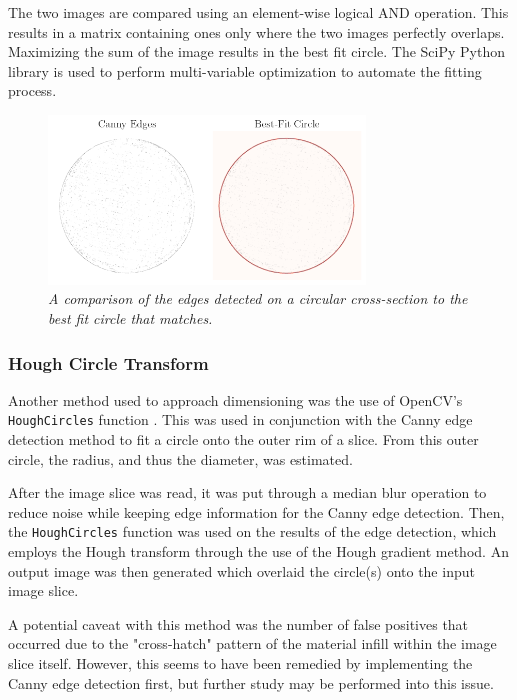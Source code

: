 \documentclass[11pt, letterpaper]{article}
\begin{document}
        The two images are compared using an element-wise logical AND operation. This results in a matrix containing ones only where the two images perfectly overlaps. Maximizing the sum of the image results in the best fit circle. The SciPy\cite{virtanen_scipy_2020} Python library is used to perform multi-variable optimization to automate the fitting process.
        \begin{figure}[H]
            \centering
            \label{fig:edges-v-circle}
            \includegraphics[width=0.75\textwidth]{edges_v_circle.png}
            \caption{\emph{A comparison of the edges detected on a circular cross-section to the best fit circle that matches.}}
        \end{figure}


    \subsubsection{Hough Circle Transform}
        Another method used to approach dimensioning was the use of OpenCV's \verb|HoughCircles| function \cite{noauthor_opencv:_nodate}. This was used in conjunction with the Canny edge detection method to fit a circle onto the outer rim of a slice. From this outer circle, the radius, and thus the diameter, was estimated.

        After the image slice was read, it was put through a median blur operation to reduce noise while keeping edge information for the Canny edge detection. Then, the \verb|HoughCircles| function was used on the results of the edge detection, which employs the Hough transform through the use of the Hough gradient method. An output image was then generated which overlaid the circle(s) onto the input image slice.

        A potential caveat with this method was the number of false positives that occurred due to the "cross-hatch" pattern of the material infill within the image slice itself. However, this seems to have been remedied by implementing the Canny edge detection first, but further study may be performed into this issue.
\end{document}
